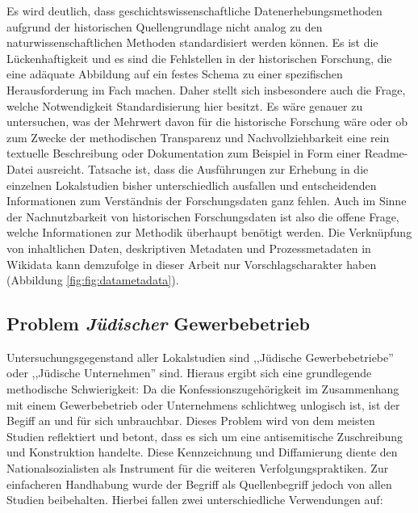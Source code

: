 Es wird deutlich, dass geschichtswissenschaftliche Datenerhebungsmethoden aufgrund der historischen Quellengrundlage nicht analog zu den naturwissenschaftlichen Methoden standardisiert werden können. Es ist die Lückenhaftigkeit und es sind die Fehlstellen in der historischen Forschung, die eine adäquate Abbildung auf ein festes Schema zu einer spezifischen Herausforderung im Fach machen. Daher stellt sich insbesondere auch die Frage, welche Notwendigkeit Standardisierung hier besitzt. Es wäre genauer zu untersuchen, was der Mehrwert davon für die historische Forschung wäre oder ob zum Zwecke der methodischen Transparenz und Nachvollziehbarkeit eine rein textuelle Beschreibung oder Dokumentation zum Beispiel in Form einer Readme-Datei ausreicht. Tatsache ist, dass die Ausführungen zur Erhebung in die einzelnen Lokalstudien bisher unterschiedlich ausfallen und entscheidenden Informationen zum Verständnis der Forschungsdaten ganz fehlen. Auch im Sinne der Nachnutzbarkeit von historischen Forschungsdaten ist also die offene Frage, welche Informationen zur Methodik überhaupt benötigt werden. Die Verknüpfung von inhaltlichen Daten, deskriptiven Metadaten und Prozessmetadaten in Wikidata kann demzufolge in dieser Arbeit nur Vorschlagscharakter haben (Abbildung \ref{fig:fig:datametadata}).

\subsection{Problem \textit{Jüdischer} Gewerbebetrieb}

Untersuchungsgegenstand aller Lokalstudien sind ,,Jüdische Gewerbebetriebe'' oder ,,Jüdische Unternehmen'' sind. Hieraus ergibt sich eine grundlegende methodische Schwierigkeit: Da die Konfessionszugehörigkeit im Zusammenhang mit einem Gewerbebetrieb oder Unternehmens schlichtweg unlogisch ist, ist der Begiff an und für sich unbrauchbar. Dieses Problem wird von dem meisten Studien reflektiert und betont, dass es sich um eine antisemitische Zuschreibung und Konstruktion handelte. Diese Kennzeichnung und Diffamierung diente den Nationalsozialisten als Instrument für die weiteren Verfolgungspraktiken. Zur einfacheren Handhabung wurde der Begriff als Quellenbegriff jedoch von allen Studien beibehalten. Hierbei fallen zwei unterschiedliche Verwendungen auf: 

